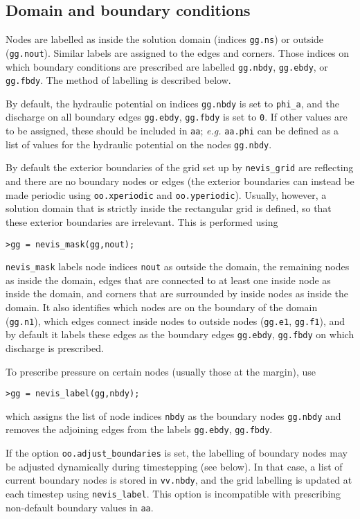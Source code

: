 \documentclass[a4paper,11pt,fleqn]{article}
\begin{document}
{{\subsection*{Domain and boundary conditions}

Nodes are labelled as inside the solution domain (indices \verb|gg.ns|) or outside (\verb|gg.nout|).  Similar labels are assigned to the edges and corners.  Those indices on which boundary conditions are prescribed are labelled \verb|gg.nbdy|, \verb|gg.ebdy|, or \verb|gg.fbdy|.  The method of labelling is described below.

By default, the hydraulic potential on indices \verb|gg.nbdy| is set to \verb|phi_a|, and the discharge on all boundary edges \verb|gg.ebdy|, \verb|gg.fbdy| is set to \verb|0|.   If other values are to be assigned, these should be included in \verb|aa|; {\it e.g.} \verb|aa.phi| can be defined as a list of values for the hydraulic potential on the nodes \verb|gg.nbdy|.

By default the exterior boundaries of the grid set up by \verb|nevis_grid| are reflecting and there are no boundary nodes or edges (the exterior boundaries can instead be made periodic using \verb|oo.xperiodic| and \verb|oo.yperiodic|).  Usually, however, a solution domain that is strictly inside the rectangular grid is defined, so that these exterior boundaries are irrelevant.  This is performed using
\begin{verbatim}
>gg = nevis_mask(gg,nout);
\end{verbatim}
\verb|nevis_mask| labels node indices \verb|nout| as outside the domain, the remaining nodes as inside the domain, edges that are connected to at least one inside node as inside the domain, and corners that are surrounded by inside nodes as inside the domain.  It also identifies which nodes are on the boundary of the domain (\verb|gg.n1|), which edges connect inside nodes to outside nodes (\verb|gg.e1|, \verb|gg.f1|), and by default it labels these edges as the boundary edges \verb|gg.ebdy|, \verb|gg.fbdy| on which discharge is prescribed.

To prescribe pressure on certain nodes (usually those at the margin), use
\begin{verbatim}
>gg = nevis_label(gg,nbdy);
\end{verbatim}
which assigns the list of node indices \verb|nbdy| as the boundary nodes \verb|gg.nbdy| and removes the adjoining edges from the labels \verb|gg.ebdy|, \verb|gg.fbdy|.

If the option \verb|oo.adjust_boundaries| is set, the labelling of boundary nodes may be adjusted dynamically during timestepping (see below).  In that case, a list of current boundary nodes is stored in \verb|vv.nbdy|, and the grid labelling is updated at each timestep using \verb|nevis_label|.  This option is incompatible with prescribing non-default boundary values in \verb|aa|.

}}
\end{document}

